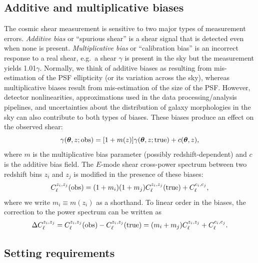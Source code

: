 \documentclass[aps,prd, amsmath,amssymb,superscriptaddress,showkeys,nofootinbib,reprint,preprintnumbers]{revtex4-1}
\begin{document}
\begin{widetext}
\subsection{Additive and multiplicative biases}
\label{ss:add_mult}

The cosmic shear measurement is sensitive to two major types of
measurement errors. {\em Additive bias} or ``spurious shear'' is a
shear signal that is detected even when none is present. {\em
Multiplicative bias} or ``calibration bias'' is an incorrect response
to a real shear, e.g.\ a shear $\gamma$ is present in the sky but the
measurement yields 1.01$\gamma$. Normally, we think of additive biases
as resulting from mis-estimation of the PSF ellipticity (or its
variation across the sky), whereas multiplicative biases result from
mis-estimation of the size of the PSF. However, detector
nonlinearities, approximations used in the data processing/analysis
pipelines, and uncertainties about the distribution of galaxy
morphologies in the sky can also contribute to both types of
biases. These biases produce an effect on the observed shear:
\begin{equation}
\gamma({\boldsymbol\theta},z;{\rm obs}) = [1+m(z)] \gamma({\boldsymbol\theta},z;{\rm true}) + c({\boldsymbol\theta},z),
\label{eq:gmod}
\end{equation}
where $m$ is the multiplicative bias parameter (possibly
redshift-dependent) and $c$ is the additive bias field. The $E$-mode
shear cross-power spectrum between two redshift bins $z_i$ and $z_j$
is modified in the presence of these biases:
\begin{equation}
C_\ell^{z_i,z_j}({\rm obs}) = (1+m_i)(1+m_j)C_\ell^{z_i,z_j}({\rm true}) + C_\ell^{c_i,c_j},
\label{eq:mod}
\end{equation}
where we write $m_i\equiv m(z_i)$ as a shorthand. To linear order in
the biases, the correction to the power spectrum can be written as
\begin{equation}
\Delta C_\ell^{z_i,z_j} = C_\ell^{z_i,z_j}({\rm obs}) - C_\ell^{z_i,z_j}({\rm true}) = (m_i+m_j)C_\ell^{z_i,z_j}+C_\ell^{c_i,c_j}.
\label{eq:Delta C}
\end{equation}

\subsection{Setting requirements}


\end{widetext}
\end{document}
